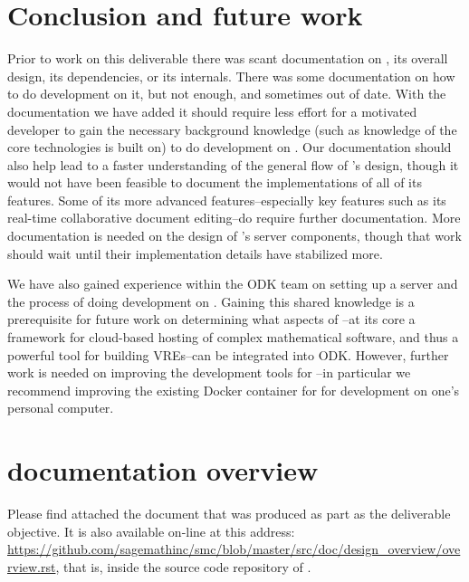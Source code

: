 \documentclass{deliverablereport}
\renewcommand{\SMC}{\software{SMC}}
\begin{document}
\section{Conclusion and future work}
Prior to work on this deliverable there was scant documentation on \SMC, its
overall design, its dependencies, or its internals.  There was some
documentation on how to do development on it, but not enough, and sometimes out
of date.  With the documentation we have added it should require less effort
for a motivated developer to gain the necessary background knowledge (such as
knowledge of the core technologies \SMC is built on) to do development on \SMC.
Our documentation should also help lead to a faster understanding of the
general flow of \SMC's design, though it would not have been feasible to
document the implementations of all of its features.  Some of its more advanced
features--especially key features such as its real-time collaborative document
editing--do require further documentation.  More documentation is needed on the
design of \SMC's server components, though that work should wait until their
implementation details have stabilized more.

We have also gained experience within the ODK team on setting up a
\SMC server and the process of doing development on \SMC.  Gaining this shared
knowledge is a prerequisite for future work on determining what aspects of
\SMC--at its core a framework for cloud-based hosting of complex mathematical
software, and thus a powerful tool for building VREs--can be integrated into
ODK.  However, further work is needed on improving the development
tools for \SMC--in particular we recommend improving the existing Docker
container for \SMC for development on one's personal computer.


\appendix
\section{\SMC documentation overview}
\label{app:doc}

Please find attached the document that was produced as part as the deliverable
objective.  It is also available on-line at this address:
\url{https://github.com/sagemathinc/smc/blob/master/src/doc/design_overview/overview.rst},
that is, inside the source code repository of \SMC.


\end{document}
